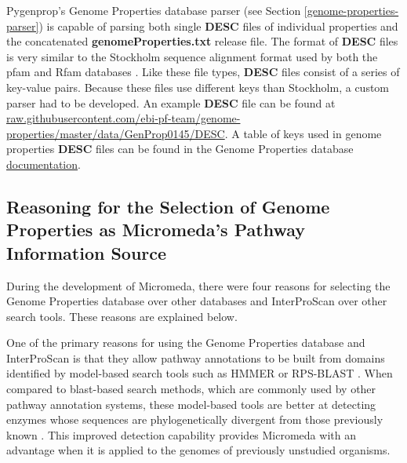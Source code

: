 Pygenprop's Genome Properties database parser (see Section \ref{genome-properties-parser}) is capable of parsing both single \textbf{DESC} files of individual properties and the concatenated \textbf{genomeProperties.txt} release file. The format of \textbf{DESC} files is very similar to the Stockholm sequence alignment format used by both the \gls{pfam} and Rfam databases \cite{bateman2004pfam, griffiths2003rfam}. Like these file types, \textbf{DESC} files consist of a series of key-value pairs. Because these files use different keys than Stockholm, a custom parser had to be developed. An example \textbf{DESC} file can be found at \href{http://raw.githubusercontent.com/ebi-pf-team/genome-properties/master/data/GenProp0145/DESC}{raw.githubusercontent.com/ebi-pf-team/genome-properties/master/data/GenProp0145/DESC}. A table of keys used in  genome properties \textbf{DESC} files can be found in the Genome Properties database \href{https://genome-properties.readthedocs.io/en/latest}{documentation}.

\subsection{Reasoning for the Selection of Genome Properties as Micromeda's Pathway Information Source} \label{reason-for-genome-properties-selection}

During the development of Micromeda, there were four reasons for selecting the Genome Properties database over other databases and InterProScan over other search tools. These reasons are explained below.

One of the primary reasons for using the Genome Properties database and InterProScan is that they allow pathway annotations to be built from domains identified by model-based search tools such as HMMER \cite{eddy2011accelerated} or RPS-BLAST \cite{mcginnis2004blast}. When compared to \gls{blast}-based \cite{altschul1990basic} search methods, which are commonly used by other pathway annotation systems, these model-based tools are better at detecting enzymes whose sequences are phylogenetically divergent from those previously known \cite{eddy2011accelerated}. This improved detection capability provides Micromeda with an advantage when it is applied to the genomes of previously unstudied organisms.

